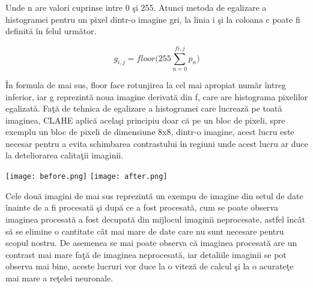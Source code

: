 Unde n are valori cuprinse intre 0 \c{s}i 255. Atunci metoda de egalizare a histogramei pentru un pixel dintr-o imagine gri, la linia i \c{s}i la coloana c poate fi definit\u{a} \^{i}n felul urm\u{a}tor.

$$g_{i,j} = floor\bigg( 255 \sum_{n=0}^{f{i,j}} p_n \bigg)$$

\^{I}n formula de mai sus, floor face rotunjirea la cel mai apropiat num\u{a}r \^{i}ntreg inferior, iar g reprezint\u{a} noua imagine derivat\u{a} din f, care are histograma pixelilor egalizat\u{a}. Fa\c{t}\u{a} de tehnica de egalizare a histogramei care lucreaz\u{a} pe toat\u{a} imaginea, CLAHE aplic\u{a} acela\c{s}i principiu doar c\u{a} pe un bloc de pixeli, spre exemplu un bloc de pixeli de dimensiune 8x8, dintr-o imagine, acest lucru este necesar pentru a evita schimbarea contrastului \^{i}n regiuni unde acest lucru ar duce la deteliorarea calita\c{t}ii imaginii.

\begin{center}
\texttt{[image: before.png]}
\texttt{[image: after.png]}
\end{center}

Cele dou\u{a} imagini de mai sus reprezint\u{a} un exempu de imagine din setul de date \^{i}nainte de a fi procesat\u{a} \c{s}i dup\u{a} ce a fost procesat\u{a}, cum se poate observa imaginea procesat\u{a} a fost decupat\u{a} din mijlocul imaginii neprocesate, astfel \^{i}nc\^{a}t s\u{a} se elimine o cantitate c\^{a}t mai mare de date care nu sunt necesare pentru scopul nostru. De asemenea se mai poate observa c\u{a} imaginea procesat\u{a} are un contrast mai mare fa\c{t}\u{a} de imaginea neprocesat\u{a}, iar detaliile imaginii se pot observa mai bine, aceste lucruri vor duce la o vitez\u{a} de calcul \c{s}i la o acurate\c{t}e mai mare a re\c{t}elei neuronale.

\par

